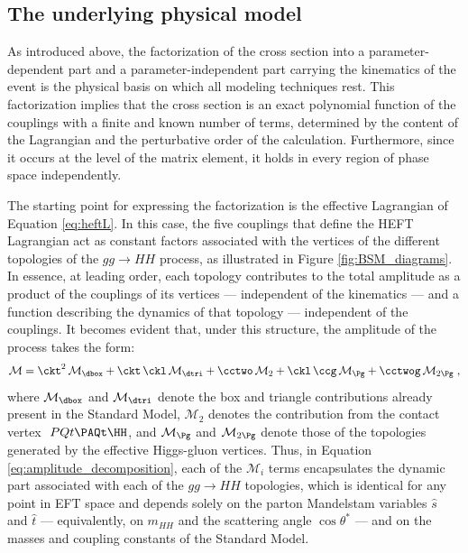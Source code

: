 \subsection{The underlying physical model}
\label{subsec:physical_model}
%
As introduced above, the factorization of the cross section into a parameter-dependent part and a parameter-independent part carrying the kinematics of the event is the physical basis on which all modeling techniques rest. This factorization implies that the cross section is an exact polynomial function of the couplings with a finite and known number of terms, determined by the content of the Lagrangian and the perturbative order of the calculation. Furthermore, since it occurs at the level of the matrix element, it holds in every region of phase space independently.

The starting point for expressing the factorization is the effective Lagrangian of Equation \ref{eq:heftL}. In this case, the five couplings that define the HEFT Lagrangian act as constant factors associated with the vertices of the different topologies of the $gg\to HH$ process, as illustrated in Figure \ref{fig:BSM_diagrams}. In essence, at leading order, each topology contributes to the total amplitude as a product of the couplings of its vertices — independent of the kinematics — and a function describing the dynamics of that topology — independent of the couplings. It becomes evident that, under this structure, the amplitude of the process takes the form:
%
\begin{equation}
    \mathcal{M} = \ckt^{2}\,\mathcal{M}_{\dbox}
    + \ckt\,\ckl\,\mathcal{M}_{\dtri}
    + \cctwo\,\mathcal{M}_{2}
    + \ckl\,\ccg\,\mathcal{M}_{\Pg}
    + \cctwog\,\mathcal{M}_{2\Pg}\;,
\label{eq:amplitude_decomposition}
\end{equation}
%
where $\mathcal{M}_{\dbox}$ and $\mathcal{M}_{\dtri}$ denote the box and triangle contributions already present in the Standard Model, $\mathcal{M}_{2}$ denotes the contribution from the contact vertex $\ PQt\PAQt\HH$, and $\mathcal{M}_{\Pg}$ and $\mathcal{M}_{2\Pg}$ denote those of the topologies generated by the effective Higgs-gluon vertices. Thus, in Equation \ref{eq:amplitude_decomposition}, each of the $\mathcal{M}_i$ terms encapsulates the dynamic part associated with each of the $gg\to HH$ topologies, which is identical for any point in EFT space and depends solely on the parton Mandelstam variables $\hat{s}$ and $\hat{t}$ — equivalently, on $m_{HH}$ and the scattering angle $\cos\theta^{*}$ \cite{Carvalho:2017vnu} — and on the masses and coupling constants of the Standard Model.\\

